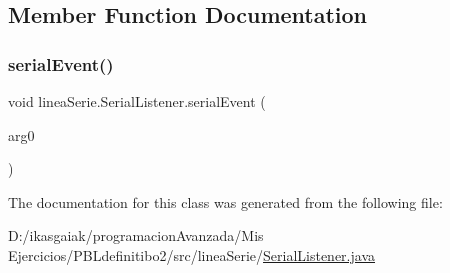 \subsection{Member Function Documentation}
\mbox{\label{classlinea_serie_1_1_serial_listener_a0538dd970dc1d309863936aaf2e505e4}} 
\subsubsection{\texorpdfstring{serial\+Event()}{serialEvent()}}
{\footnotesize\ttfamily void linea\+Serie.\+Serial\+Listener.\+serial\+Event (\begin{DoxyParamCaption}\item[{Serial\+Port\+Event}]{arg0 }\end{DoxyParamCaption})}



The documentation for this class was generated from the following file\+:\begin{DoxyCompactItemize}
\item 
D\+:/ikasgaiak/programacion\+Avanzada/\+Mis Ejercicios/\+P\+B\+Ldefinitibo2/src/linea\+Serie/\mbox{\hyperlink{_serial_listener_8java}{Serial\+Listener.\+java}}\end{DoxyCompactItemize}
